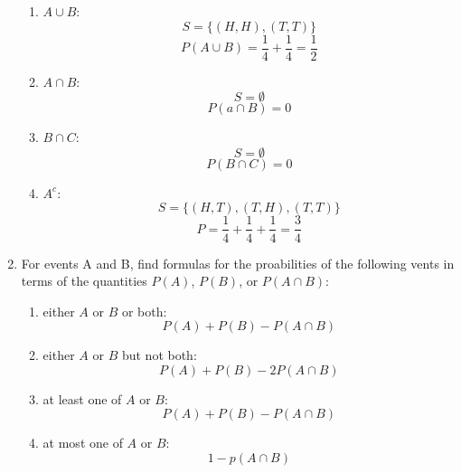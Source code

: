 \documentclass[12pt, letterpaper]{article}
\begin{document}
\begin{enumerate}
		\begin{enumerate}
			\item $A \cup B$: 
				$$S = \{(H,H),(T,T)\}$$
				$$P(A \cup B) = \frac{1}{4} + \frac{1}{4} = \frac{1}{2}$$
			\item $A \cap B $:
				$$S = \emptyset$$
				$$P(a \cap B) = 0$$
			\item $B \cap C$: 
				$$S = \emptyset$$
				$$P(B \cap C) = 0$$
			\item $A^c$: 
				$$S = \{(H,T), (T,H), (T,T)\}$$
				$$P = \frac{1}{4} + \frac{1}{4} + \frac{1}{4} = \frac{3}{4}$$
		\end{enumerate}
		
	\item For events A and B, find formulas for the proabilities of the following vents in terms of the quantities $P(A)$, $P(B)$, or $P(A \cap B)$:
		\begin{enumerate}
			\item either $A$ or $B$ or both:
			$$P(A) + P(B) - P(A \cap B)$$
			\item either $A$ or $B$ but not both:
			$$P(A) + P(B) - 2P(A \cap B)$$
			\item at least one of $A$ or $B$:
			$$P(A) + P(B) - P(A \cap B)$$
			\item at most one of $A$ or $B$:
			$$1 - p(A \cap B)$$
		\end{enumerate}		
	 \end{enumerate}



 
\end{document}
